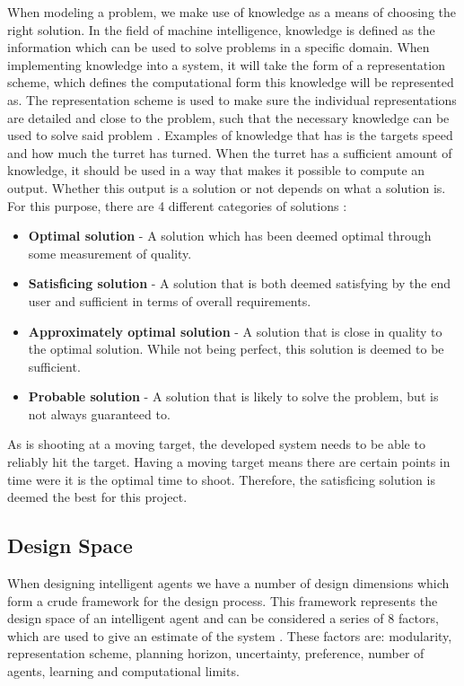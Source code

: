 When modeling a problem, we make use of knowledge as a means of choosing the
right solution. In the field of machine intelligence, knowledge is defined as
the information which can be used to solve problems in a specific domain. When
implementing knowledge into a system, it will take the form of a representation
scheme, which defines the computational form this knowledge will be represented
as. The representation scheme is used to make sure the individual
representations are detailed and close to the problem, such that the necessary
knowledge can be used to solve said problem \citep[ch.1.4]{MIBook}.
Examples of knowledge that \name has is the targets speed and how much the
turret has turned. When the turret has a sufficient amount of knowledge, it
should be used in a way that makes it possible to compute an output. Whether
this output is a solution or not depends on what a solution is. For this
purpose, there are 4 different categories of solutions \citep[ch.1.4.1]{MIBook}:

\begin{itemize}
  \item \textbf{Optimal solution} - A solution which has been deemed optimal
  through some measurement of quality.
  \item \textbf{Satisficing solution} - A solution that is both deemed
  satisfying by the end user and sufficient in terms of overall requirements. 
  \item \textbf{Approximately optimal solution} - A solution that is close in
  quality to the optimal solution. While not being perfect, this solution is
  deemed to be sufficient.
  \item \textbf{Probable solution} - A solution that is likely to solve the
  problem, but is not always guaranteed to.
\end{itemize}

As \name is shooting at a moving target, the developed system needs to be able
to reliably hit the target. Having a moving target means there are certain
points in time were it is the optimal time to shoot. Therefore, the satisficing
solution is deemed the best for this project. 

\subsection{Design Space}
When designing intelligent agents we have a number of design dimensions which
form a crude framework for the design process. This framework represents the
design space of an intelligent agent and can be considered a series of 8
factors, which are used to give an estimate of the system
\citep[ch.1.5]{MIBook}. These factors are: modularity, representation scheme,
planning horizon, uncertainty, preference, number of agents, learning and
computational limits.

